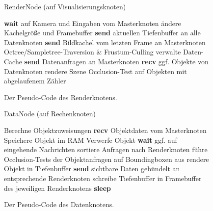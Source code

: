 \begin{figure*}[ttt!]
\centering
 \begin{minipage}[t]{12cm}
\begin{algorithm}[H]
  \caption{RenderNode (auf Visualisierungsknoten)\label{fig:impl:rendernode}} 
    \begin{algorithmic} [1]
	\STATE \textbf{wait} auf Kamera und Eingaben vom Masterknoten
	  \STATE ändere Kachelgröße und Framebuffer
	  \STATE \textbf{send} aktuellen Tiefenbuffer an alle Datenknoten
	\ENDIF
	\STATE \textbf{send} Bildkachel vom letzten Frame an Masterknoten
	\STATE Octree/Sampletree-Traversion \& Frustum-Culling
	\STATE verwalte Daten-Cache
	\STATE \textbf{send} Datenanfragen an Masterknoten
	\STATE \textbf{recv} ggf. Objekte von Datenknoten
	\STATE rendere Szene
	\STATE Occlusion-Test auf Objekten mit abgelaufenem Zähler
      \ENDWHILE
    \end{algorithmic}
\end{algorithm}
 \end{minipage}
\caption{Der Pseudo-Code des Renderknotens.}
\end{figure*}

\begin{figure*}[ttt!]
\centering
 \begin{minipage}[t]{12cm}
\begin{algorithm}[H]
  \caption{DataNode (auf Rechenknoten)\label{fig:impl:datanode}} 
    \begin{algorithmic} [1]
      \STATE Berechne Objektzuweisungen
      \STATE \textbf{recv} Objektdaten vom Masterknoten
	\STATE Speichere Objekt im RAM
      \ELSE
	\STATE Verwerfe Objekt
      \ENDIF
	\STATE \textbf{wait} ggf. auf eingehende Nachrichten
	  \STATE sortiere Anfragen nach Renderknoten
	    \STATE führe Occlusion-Tests der Objektanfragen auf Boundingboxen aus
	  \ENDFOR
	    \STATE rendere Objekt in Tiefenbuffer
 	  \ENDFOR
	  \STATE \textbf{send} sichtbare Daten gebündelt an entsprechende Renderknoten
	  \STATE schreibe Tiefenbuffer in Framebuffer des jeweiligen Renderknotens
	\ELSE \STATE\textbf{sleep}
	\ENDIF
      \ENDWHILE
    \end{algorithmic}
\end{algorithm}
 \end{minipage}
\caption{Der Pseudo-Code des Datenknotens.}
\end{figure*}


